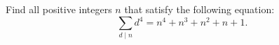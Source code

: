 Find all positive integers $n$ that satisfy the following equation:
$$\sum_{d\mid n}d^4=n^4+n^3+n^2+n+1.$$
